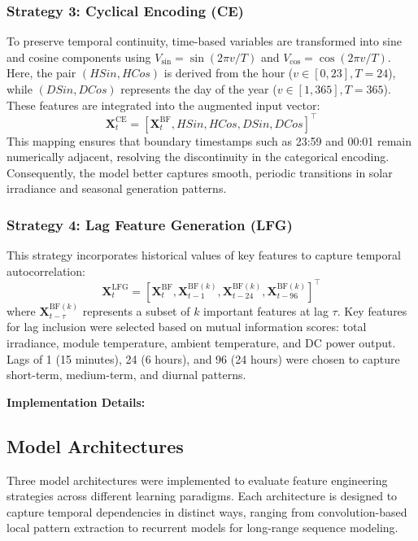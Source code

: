\documentclass[conference]{IEEEtran}
\begin{document}
	\subsubsection{Strategy 3: Cyclical Encoding (CE)}
	To preserve temporal continuity, time-based variables are transformed into sine and cosine components using $V_{\sin} = \sin(2\pi v/T)$ and $V_{\cos} = \cos(2\pi v/T)$. Here, the pair $(HSin, HCos)$ is derived from the hour ($v \in [0, 23], T=24$), while $(DSin, DCos)$ represents the day of the year ($v \in [1, 365], T=365$). These features are integrated into the augmented input vector:
	\begin{equation*}
		\mathbf{X}_t^{\text{CE}} = [\mathbf{X}_t^{\text{BF}}, HSin, HCos, DSin, DCos]^\top
	\end{equation*}
	This mapping ensures that boundary timestamps such as 23:59 and 00:01 remain numerically adjacent, resolving the discontinuity in the categorical encoding. Consequently, the model better captures smooth, periodic transitions in solar irradiance and seasonal generation patterns.
	
	\subsubsection{Strategy 4: Lag Feature Generation (LFG)}
	This strategy incorporates historical values of key features to capture temporal autocorrelation:
	\begin{equation*}
		\mathbf{X}_t^{\text{LFG}} = [\mathbf{X}_t^{\text{BF}}, \mathbf{X}_{t-1}^{\text{BF}(k)}, \mathbf{X}_{t-24}^{\text{BF}(k)}, \mathbf{X}_{t-96}^{\text{BF}(k)}]^\top
	\end{equation*}
	where $\mathbf{X}_{t-\tau}^{\text{BF}(k)}$ represents a subset of $k$ important features at lag $\tau$. Key features for lag inclusion were selected based on mutual information scores: total irradiance, module temperature, ambient temperature, and DC power output. Lags of 1 (15 minutes), 24 (6 hours), and 96 (24 hours) were chosen to capture short-term, medium-term, and diurnal patterns.
	
	\textbf{Implementation Details:}
	
	\subsection{Model Architectures}
	Three model architectures were implemented to evaluate feature engineering strategies across different learning paradigms. Each architecture is designed to capture temporal dependencies in distinct ways, ranging from convolution-based local pattern extraction to recurrent models for long-range sequence modeling.
	
\end{document}
